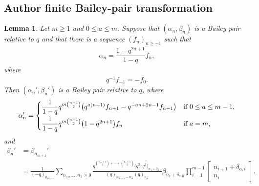 \documentclass[11pt]{article}
\numberwithin{equation}{section}
\newtheorem{Lemma}[Theorem]{Lemma}
\numberwithin{equation}{section}
\begin{document}
\setcounter{section}{3}\setcounter{Theorem}{0}\setcounter{equation}{0}\subsection*{Author finite Bailey-pair transformation}
\begin{Lemma} \label{lemma:mainpair}
	Let $m \geq 1$ and $0 \leq a \leq m$. Suppose that $(\alpha_n,\beta_n)$ is a Bailey pair relative to $q$ and that there is a sequence $(f_n)_{n \geq -1}$ such that
	\begin{align} \label{eqn:fdeflater}
		\alpha_n=\dfrac{1-q^{2n+1}}{1-q}f_n,
	\end{align}
	where
	\begin{align}
		q^{-1}f_{-1}=-f_0.
		\label{eqn:f-1f0}
	\end{align}
	Then $(\alpha_n',\beta_n')$ is a Bailey pair relative to $q$, where
	\begin{equation*} %
		\alpha_n' =
		\begin{cases}
			\dfrac{1}{1-q}q^{m\binom{n+1}{2}}\bigl(
			q^{a(n+1)}f_{n+1} -q^{-an+2n-1}f_{n-1}
			\bigr) & \text{if $0 \leq a \leq m-1$}, \vspace{1mm}\\
			\dfrac{1}{1-q}q^{m \binom{n+1}{2}}\bigl(1-q^{2n+1}\bigr)f_n &\text{if $a=m$},
		\end{cases}
	\end{equation*}
	and
	\begin{align}
		\beta_n' &{}= \beta_{n_{m+1}}' \nonumber \\
 &{}= \frac{1}{(-q)_{n_{m+1}}} \sum_{n_m, \dots, n_1 \geq 0} \frac{q^{\binom{n_m+1}{2} + \cdots + \binom{n_1+1}{2}}\bigl(q^2;q^2\bigr)_{n_1+\delta_{a,0}}}{(q)_{n_{m+1}-n_m} (q)_{n_m}} \beta_{n_1+\delta_{a,0}} \prod_{i=1}^{m-1} \begin{bmatrix} n_{i+1} + \delta_{a,i} \\ n_i \end{bmatrix}.\label{eqn:mainpairbeta}
	\end{align}
	
\end{Lemma}
\end{document}
